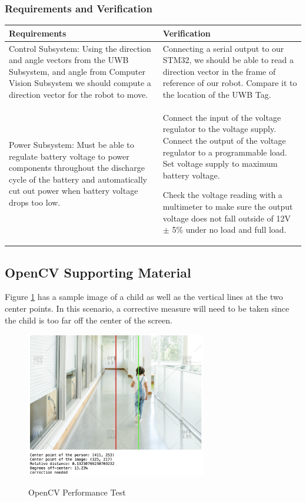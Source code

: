\documentclass[journal,onecolumn, draftclsnofoot, 12pt]{IEEEtran}
\begin{document}
\subsubsection{Requirements and Verification}
\begin{center}
\begin{tabular}{ | m{20em} || m{20em} | } 
  \hline
  Requirements & Verification  \\ 
  \hline
  \hline
  Control Subsystem: Using the direction and angle vectors from the UWB Subsystem, and angle from Computer Vision Subsystem we should compute a direction vector for the robot to move.
  & 
  Connecting a serial output to our STM32, we should be able to read a direction vector in the frame of reference of our robot. Compare it to the location of the UWB Tag.
  \\ 
  \hline
  Power Subsystem: Must be able to regulate battery voltage to power components throughout the discharge cycle of the battery and automatically cut out power when battery voltage drops too low.
  & 
  Connect the input of the voltage regulator to the voltage supply. Connect the output of the voltage regulator to a programmable load. Set voltage supply to maximum battery voltage.
  
  Check the voltage reading with a multimeter to make sure the output voltage does not fall outside of 12V $\pm$ 5\% under no load and full load. 
  \\ 
  \hline
\end{tabular}
\end{center}

\newpage

\subsection{OpenCV Supporting Material}

Figure \ref{fig:CVModule_PerformanceTest} has a sample image of a child as well as the vertical lines at the two center points. In this scenario, a corrective measure will need to be taken since the child is too far off the center of the screen.

\begin{figure}[H]
\begin{center}
    \includegraphics[width=0.7\textwidth]{CVModule_PerformanceTest.png}\\
    \caption{ OpenCV Performance Test  } 
    \label{fig:CVModule_PerformanceTest}
\end{center}
\end{figure}
\end{document}
